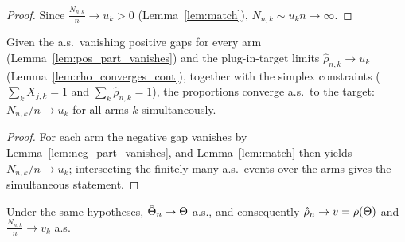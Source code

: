 \begin{proof}\leanok
{}
Since $\frac{N_{n,k}}{n}\to u_k > 0$ (Lemma~\ref{lem:match}), $N_{n,k}\sim u_k n
\to\infty$.
\end{proof}

\begin{lemma}\label{lem:consistency_matching}
\leanok
{}
Given the a.s.\ vanishing positive gaps for every arm (Lemma~\ref{lem:pos_part_vanishes}) and the
plug-in-target limits $\hat\rho_{n,k}\to u_k$ (Lemma~\ref{lem:rho_converges_cont}), together with
the simplex constraints ($\sum_k X_{j,k}=1$ and $\sum_k\hat\rho_{n,k}=1$), the proportions converge
a.s.\ to the target: $N_{n,k}/n \to u_k$ for all arms $k$ simultaneously.
\end{lemma}

\begin{proof}\leanok
{}
For each arm the negative gap vanishes by Lemma~\ref{lem:neg_part_vanishes}, and
Lemma~\ref{lem:match} then yields $N_{n,k}/n\to u_k$; intersecting the finitely many a.s.\ events
over the arms gives the simultaneous statement.
\end{proof}

\begin{lemma}\label{lem:theta_consistent}
\leanok
{}
Under the same hypotheses, $\hat{\Theta}_n \to \Theta$ a.s., and consequently
$\hat{\rho}_n \to v = \rho(\Theta)$ and $\frac{N_{n,k}}{n}\to v_k$ a.s.
\end{lemma}

